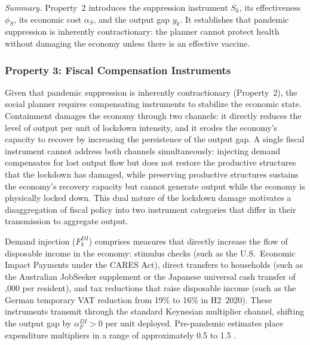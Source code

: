 \documentclass[12pt, a4paper]{article}
\newcommand{\Sk}{S_k}
\begin{document}
\medskip
\noindent\textit{Summary.} Property~2 introduces the suppression instrument $\Sk$, its effectiveness $\phi_S$, its economic cost $\alpha_S$, and the output gap $y_k$. It establishes that pandemic suppression is inherently contractionary: the planner cannot protect health without damaging the economy unless there is an effective vaccine.




\subsubsection*{Property 3: Fiscal Compensation Instruments}

Given that pandemic suppression is inherently contractionary (Property~2), the social planner requires compensating instruments to stabilize the economic state. Containment damages the economy through two channels: it directly reduces the level of output per unit of lockdown intensity, and it erodes the economy's capacity to recover by increasing the persistence of the output gap. A single fiscal instrument cannot address both channels simultaneously: injecting demand compensates for lost output flow but does not restore the productive structures that the lockdown has damaged, while preserving productive structures sustains the economy's recovery capacity but cannot generate output while the economy is physically locked down. This dual nature of the lockdown damage motivates a disaggregation of fiscal policy into two instrument categories that differ in their transmission to aggregate output.

Demand injection ($F^{DI}_k$) comprises measures that directly increase the flow of disposable income in the economy: stimulus checks (such as the U.S.\ Economic Impact Payments under the CARES Act), direct transfers to households (such as the Australian JobSeeker supplement or the Japanese universal cash transfer of ,000 per resident), and tax reductions that raise disposable income (such as the German temporary VAT reduction from 19\% to 16\% in H2~2020). These instruments transmit through the standard Keynesian multiplier channel, shifting the output gap by $\alpha^{DI}_F > 0$ per unit deployed. Pre-pandemic estimates place expenditure multipliers in a range of approximately 0.5 to 1.5 \citep{ramey2018, blanchard2002}.
\end{document}
